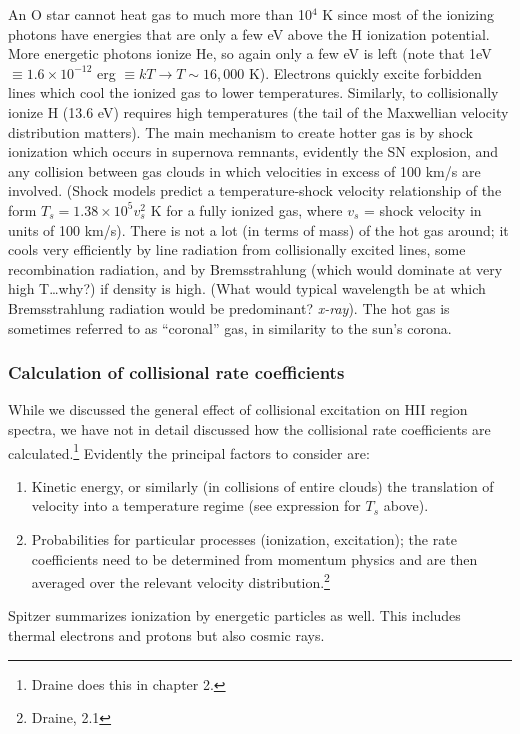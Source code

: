 \documentclass[12pt]{article}
\newcommand{\mar}[1]{\hspace{0pt}\marginpar{-\textcolor{black}{#1}-}}
\newcommand{\mynotes}[1]{{\fontfamily{cmss}\selectfont \textit{#1}}}
\begin{document}
An O star cannot heat gas to much more than 10$^{4}$ K since most of the
ionizing photons have energies that are only a few eV above the H ionization
potential. More energetic photons ionize He, so again only a few eV is left
(note that 1eV
$\equiv 1.6 \times 10^{-12}$ erg $\equiv kT \rightarrow T \sim 16,000$ K).
Electrons quickly excite forbidden lines which cool the ionized gas to
lower temperatures. Similarly, to collisionally ionize H (13.6 eV) requires
high temperatures (the tail of the Maxwellian velocity distribution
matters). The main mechanism to create hotter gas is by shock ionization
which occurs in supernova remnants, evidently the SN explosion, and any
collision between gas clouds in which velocities \mar{143}in excess of 100
km/s are involved. (Shock models predict a temperature-shock velocity
relationship of the form $T_{s} = 1.38 \times 10^{5} v_{s}^{2}$ K for a
fully ionized gas, where $v_{s}$ = shock velocity in units of 100 km/s).
There is not a lot (in terms of mass) of the hot gas around; it cools very
efficiently by line radiation from collisionally excited lines, some
recombination radiation, and by Bremsstrahlung (which would dominate at
very high T\ldots why?) if density is high.
(What would typical wavelength be at which Bremsstrahlung radiation would
be predominant? \mynotes{x-ray}).
The hot gas is sometimes
referred to as ``coronal'' gas, in similarity to the sun's corona.

\subsubsection{Calculation of collisional rate coefficients}
While we discussed the general effect of collisional excitation on HII
region spectra, we have not in detail discussed how the collisional rate
coefficients are calculated.\footnote{Draine does this in chapter 2.}
Evidently the principal factors to consider are:
\begin{enumerate}
    \item Kinetic energy, or similarly (in collisions of entire clouds) the
        translation of velocity into a temperature regime (see expression
        for $T_{s}$ above).
    \item Probabilities for particular processes (ionization, excitation);
        the rate coefficients need to be determined from momentum physics
        and are then averaged over the relevant velocity
        distribution.\footnote{Draine, 2.1}
\end{enumerate}
Spitzer summarizes ionization by energetic particles as well. This includes
thermal electrons and protons but also cosmic rays.
\end{document}
